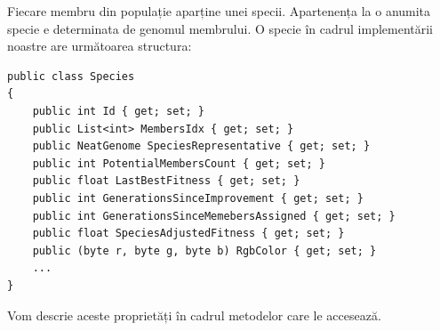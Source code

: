 Fiecare membru din populație aparține unei specii. Apartenența la o anumita specie e determinata de genomul membrului. O specie în cadrul implementării noastre are următoarea structura:
\begin{lstlisting}[caption={Reprezentarea unei specii in algoritm}, label={lst:SpeciesClass}]
public class Species
{
    public int Id { get; set; }
    public List<int> MembersIdx { get; set; }
    public NeatGenome SpeciesRepresentative { get; set; }
    public int PotentialMembersCount { get; set; }
    public float LastBestFitness { get; set; }
    public int GenerationsSinceImprovement { get; set; }
    public int GenerationsSinceMemebersAssigned { get; set; }
    public float SpeciesAdjustedFitness { get; set; }
    public (byte r, byte g, byte b) RgbColor { get; set; }
    ...
}
\end{lstlisting}
Vom descrie aceste proprietăți în cadrul metodelor care le accesează.

